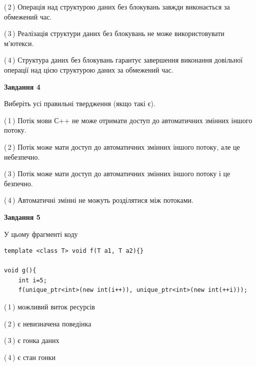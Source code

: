 \documentclass[12pt, ukrainian]{article}
\begin{document}
\begin {large}
{(\,2\,) Операція над структурою даних без блокувань завжди виконається за обмежений час.%

(\,3\,) Реалізація структури даних без блокувань не може використовувати м’ютекси.%

(\,4\,) Структура даних без блокувань гарантує завершення виконання довільної операції над цією структурою даних за обмежений час.%



\begin{center}
\textbf{Завдання 4}
\end{center}
Виберіть усі правильні твердження (якщо такі є).\par
\vspace{2mm}

(\,1\,) Потік мови С++ не може отримати доступ до автоматичних змінних іншого потоку.%

(\,2\,) Потік може мати доступ до автоматичних змінних іншого потоку, але це небезпечно.%

(\,3\,) Потік може мати доступ до автоматичних змінних іншого потоку і це безпечно.%

(\,4\,) Автоматичні змінні не можуть розділятися між потоками.%



\begin{center}
\textbf{Завдання 5}
\end{center}
У цьому фрагменті коду
\begin{verbatim}
template <class T> void f(T a1, T a2){}

void g(){
    int i=5;
    f(unique_ptr<int>(new int(i++)), unique_ptr<int>(new int(++i)));
\end{verbatim}

(\,1\,) можливий виток ресурсів%

(\,2\,) є невизначена поведінка%

(\,3\,) є гонка даних%

(\,4\,) є стан гонки%


}
\end {large}
\end{document}
